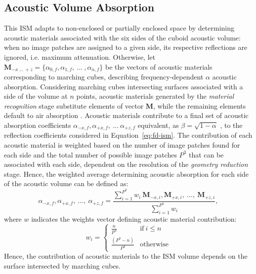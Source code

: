 \subsection{Acoustic Volume Absorption}
This ISM adapts to non-enclosed or partially enclosed space by determining acoustic materials associated with the six sides of the cuboid acoustic volume: when no image patches are assigned to a given side, its respective reflections are ignored, i.e. maximum attenuation. Otherwise, let $\mathbf{M}_{-x~\dots~+z} = \{ \alpha_{0, f}, \alpha_{1, f},~\dots~, \alpha_{n, f} \}$ be the vectors of acoustic materials corresponding to marching cubes, describing frequency-dependent $\alpha$ acoustic absorption. Considering marching cubes intersecting surfaces associated with a side of the volume at $n$ points, acoustic materials generated by the \emph{material recognition} stage substitute elements of vector $\mathbf{M}$, while the remaining elements default to air absorption \cite{kates2020adding}. Acoustic materials contribute to a final set of acoustic absorption coefficients $\alpha_{-x,f}, \alpha_{+x,f},~\dots~\alpha_{+z,f}$ equivalent, as $\beta = \sqrt{1 - \alpha}$ \cite{allen1979image}, to the reflection coefficients considered in Equation~\ref{eq:fd-ism}. The contribution of each acoustic material is weighted based on the number of image patches found for each side and the total number of possible image patches $P^3$ that can be associated with each side, dependent on the resolution of the \emph{geometry reduction} stage. Hence, the weighted average determining acoustic absorption for each side of the acoustic volume can be defined as: 
\begin{equation}
    \alpha_{-x,f}, \alpha_{+x,f},~\dots,~\alpha_{+z,f} = \frac{ \sum_{i=1}^{P^3} w_i~\mathbf{M}_{-x,i}, \mathbf{M}_{+x,i},~\dots,~\mathbf{M}_{+z,i} }{ \sum_{i = 1}^{P^3} w_i},
\label{eq:weighted_average}
\end{equation}
where $w$ indicates the weights vector defining acoustic material contribution: 
\begin{equation}
    w_i = \begin{cases}
        \frac{n}{P^3}& \text{if}~i \leq n \\
        \frac{(P^3 - n)}{P^3}& \text{otherwise}
    \end{cases}
\label{eq:patch_contribution}
\end{equation}
Hence, the contribution of acoustic materials to the ISM volume depends on the surface intersected by marching cubes.

